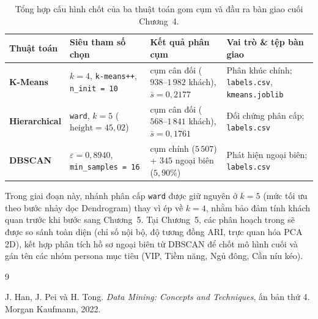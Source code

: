 \documentclass[12pt,a4paper]{article}
\numberwithin{equation}{section}
\numberwithin{table}{section}
\numberwithin{figure}{section}
\begin{document}
\begin{table}[H]
\centering
\footnotesize
\begin{tabularx}{\textwidth}{@{}l>{\raggedright\arraybackslash}p{3.4cm}>{\raggedright\arraybackslash}X>{\raggedright\arraybackslash}p{3.8cm}@{}}
\toprule
\textbf{Thuật toán} & \textbf{Siêu tham số chọn} & \textbf{Kết quả phân cụm} & \textbf{Vai trò \& tệp bàn giao} \\
\midrule
\textbf{K-Means} & $k = 4$, \texttt{k-means++}, \texttt{n\_init = 10} & 4 cụm cân đối ($938\text{--}1\,982$ khách), $\bar{s} = 0,2177$ & Phân khúc chính; \texttt{labels.csv}, \texttt{kmeans.joblib} \\
\textbf{Hierarchical} & \texttt{ward}, $k = 5$ ($\text{height} = 45,02$) & 5 cụm cân đối ($568\text{--}1\,841$ khách), $\bar{s} = 0,1761$ & Đối chứng phân cấp; \texttt{labels.csv} \\
\textbf{DBSCAN} & $\varepsilon = 0,8940$, \texttt{min\_samples = 16} & 1 cụm chính ($5\,507$) + $345$ ngoại biên ($5,90\%$) & Phát hiện ngoại biên; \texttt{labels.csv} \\
\bottomrule
\end{tabularx}
\caption{Tổng hợp cấu hình chốt của ba thuật toán gom cụm và đầu ra bàn giao cuối Chương~4.}
\label{tab:ch4_summary}
\end{table}

Trong giai đoạn này, nhánh phân cấp \texttt{ward} được giữ nguyên ở $k = 5$ (mức tối ưu theo bước nhảy dọc Dendrogram) thay vì ép về $k = 4$, nhằm bảo đảm tính khách quan trước khi bước sang Chương~5. Tại Chương~5, các phân hoạch trong  sẽ được so sánh toàn diện (chỉ số nội bộ, độ tương đồng ARI, trực quan hóa PCA 2D), kết hợp phân tích hồ sơ ngoại biên từ DBSCAN để chốt mô hình cuối và gán tên các nhóm persona mục tiêu (VIP, Tiềm năng, Ngủ đông, Cần níu kéo).

\clearpage
\renewcommand{\refname}{TÀI LIỆU THAM KHẢO}

\begin{thebibliography}{9}

J. Han, J. Pei và H. Tong. \emph{Data Mining: Concepts and Techniques}, ấn bản thứ 4. Morgan Kaufmann, 2022.

\end{thebibliography}
\end{document}
